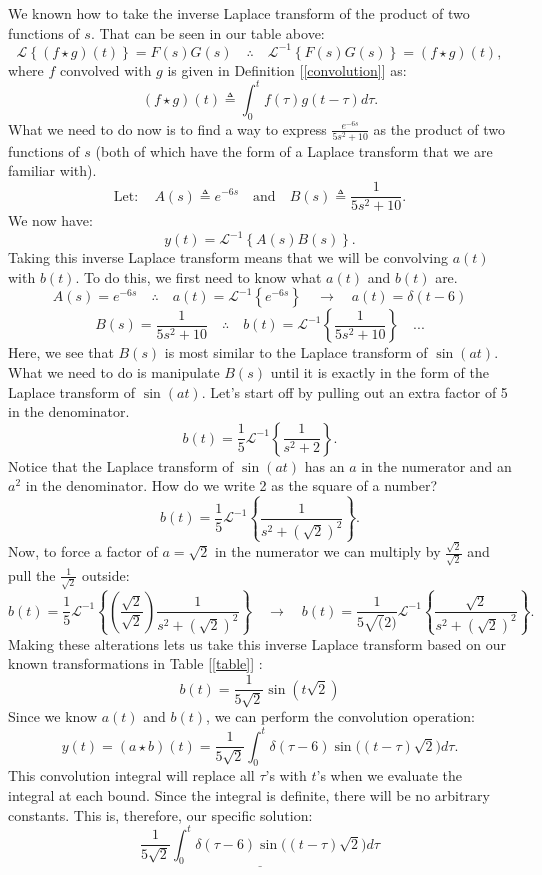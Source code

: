 \documentclass[a4paper,12pt]{article}
\begin{document}
We known how to take the inverse Laplace transform of the product of two functions of $s$. That can be seen in our table above:
$$ \mathcal{L}\left\{(f\star g)(t)\right\} = F(s)G(s) \quad\therefore\quad \mathcal{L}^{-1}\left\{F(s)G(s)\right\} = (f\star g)(t), $$
where $f$ convolved with $g$ is given in Definition [\ref{convolution}] as:
$$ (f\star g)(t) \triangleq \int_{0}^{t}f(\tau)g(t-\tau)d\tau.  $$
What we need to do now is to find a way to express $\frac{e^{-6s}}{5s^2 + 10}$ as the product of two functions of $s$ (both of which have the form of a Laplace transform that we are familiar with).
$$ \text{Let}: \quad A(s) \triangleq e^{-6s} \quad\text{and} \quad B(s)\triangleq\frac{1}{5s^2 + 10}. $$
We now have:
$$ y(t) = \mathcal{L}^{-1}\left\{A(s)B(s)\right\}. $$
Taking this inverse Laplace transform means that we will be convolving $a(t)$ with $b(t)$. To do this, we first need to know what $a(t)$ and $b(t)$ are.
$$ A(s) = e^{-6s} \quad\therefore\quad a(t) = \mathcal{L}^{-1}\left\{e^{-6s}\right\} \quad\rightarrow\quad \boxed{a(t) = \delta(t-6)} $$
$$ B(s) = \frac{1}{5s^2 + 10} \quad\therefore\quad b(t) = \mathcal{L}^{-1}\left\{\frac{1}{5s^2 + 10}\right\} \quad... $$
Here, we see that $B(s)$ is most similar to the Laplace transform of $\sin{(at)}$. What we need to do is manipulate $B(s)$ until it is exactly in the form of the Laplace transform of $\sin{(at)}$. Let's start off by pulling out an extra factor of 5 in the denominator.
$$ b(t) = \frac{1}{5}\mathcal{L}^{-1}\left\{\frac{1}{s^2 + 2}\right\}. $$
Notice that the Laplace transform of $\sin{(at)}$ has an $a$ in the numerator and an $a^2$ in the denominator. How do we write 2 as the square of a number?
$$ b(t) = \frac{1}{5}\mathcal{L}^{-1}\left\{\frac{1}{s^2 + (\sqrt{2})^2}\right\}.  $$
Now, to force a factor of $a=\sqrt{2}$ in the numerator we can multiply by $\frac{\sqrt{2}}{\sqrt{2}}$ and pull the $\frac{1}{\sqrt{2}}$ outside:
$$ b(t) = \frac{1}{5}\mathcal{L}^{-1}\left\{\left(\frac{\sqrt{2}}{\sqrt{2}}\right)\frac{1}{s^2 + (\sqrt{2})^2}\right\} \quad\rightarrow\quad b(t) = \frac{1}{5\sqrt(2)}\mathcal{L}^{-1}\left\{\frac{\sqrt2}{s^2 + (\sqrt2)^2}\right\}.$$
Making these alterations lets us take this inverse Laplace transform based on our known transformations in Table [\ref{table}] :
$$ \boxed{b(t) = \frac{1}{5\sqrt{2}}\sin{(t\sqrt{2})}} $$
Since we know $a(t)$ and $b(t)$, we can perform the convolution operation:
$$ y(t) = (a\star b)(t) = \frac{1}{5\sqrt{2}}\int_{0}^{t} \delta(\tau-6)\sin{\big((t-\tau)\sqrt{2}\big)}d\tau. $$
This convolution integral will replace all $\tau$'s with $t$'s when we evaluate the integral at each bound. Since the integral is definite, there will be no arbitrary constants. This is, therefore, our specific solution:
$$ \underline{\boxed{\frac{1}{5\sqrt{2}}\int_{0}^{t} \delta(\tau-6)\sin{\big((t-\tau)\sqrt{2}\big)}d\tau}} $$
\end{document}
